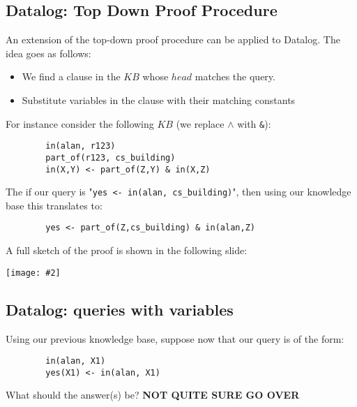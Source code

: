 \documentclass{article}
\newcommand{\centerfig}[2]{\begin{center}\texttt{[image: \#2]}\end{center}}
\begin{document}
\subsection*{Datalog: Top Down Proof Procedure}
An extension of the top-down proof procedure can be applied to Datalog. The idea goes as follows:
\begin{itemize}[label = -]
	\item We find a clause in the $ KB $ whose $ head $ matches the query. 
	\item Substitute variables in the clause with their matching constants
\end{itemize}
For instance consider the following $ KB $ (we replace $ \land $ with \texttt{\&}):
\begin{lstlisting}
		in(alan, r123)
		part_of(r123, cs_building)
		in(X,Y) <- part_of(Z,Y) & in(X,Z)
\end{lstlisting}
The if our query is "\texttt{yes <- in(alan, cs_building)}", then using our knowledge base this translates to:
\begin{lstlisting}
		yes <- part_of(Z,cs_building) & in(alan,Z)
\end{lstlisting}
A full sketch of the proof is shown in the following slide:
\centerfig{0.9}{datalog-1}
\subsection*{Datalog: queries with variables}
Using our previous knowledge base, suppose now that our query is of the form:
\begin{lstlisting}
		in(alan, X1) 
		yes(X1) <- in(alan, X1)
\end{lstlisting}
What should the answer(s) be?
\textbf{NOT QUITE SURE GO OVER}
\end{document}

